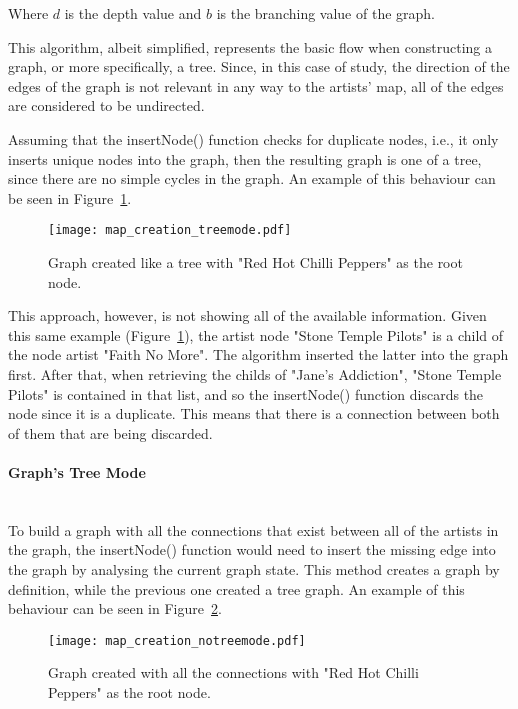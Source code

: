       Where $d$ is the depth value and $b$ is the branching value of the graph.

      This algorithm, albeit simplified, represents the basic flow when constructing a graph, or more specifically, a tree.
      Since, in this case of study, the direction of the edges of the graph is not relevant in any way to the artists' map, all of the edges are considered to be undirected.

      Assuming that the insertNode() function checks for duplicate nodes, i.e., it only inserts unique nodes into the graph, then the resulting graph is one of a tree, since there are no simple cycles in the graph.
      An example of this behaviour can be seen in Figure~\ref{fig:graph_treemode}.

      \begin{figure}[ht]
        \begin{center}
          \texttt{[image: map\_creation\_treemode.pdf]}
        \end{center}
        \caption{Graph created like a tree with "Red Hot Chilli Peppers" as the root node.}
        \label{fig:graph_treemode}
      \end{figure}

      This approach, however, is not showing all of the available information.
      Given this same example (Figure~\ref{fig:graph_treemode}), the artist node "Stone Temple Pilots" is a child of the node artist "Faith No More".
      The algorithm inserted the latter into the graph first.
      After that, when retrieving the childs of "Jane's Addiction", "Stone Temple Pilots" is contained in that list, and so the insertNode() function discards the node since it is a duplicate.
      This means that there is a connection between both of them that are being discarded.

      \paragraph{Graph's Tree Mode} \hfill \\
      To build a graph with all the connections that exist between all of the artists in the graph, the insertNode() function would need to insert the missing edge into the graph by analysing the current graph state.
      This method creates a graph by definition, while the previous one created a tree graph.
      An example of this behaviour can be seen in Figure~\ref{fig:graph_notreemode}.

      \begin{figure}[ht]
        \begin{center}
          \texttt{[image: map\_creation\_notreemode.pdf]}
        \end{center}
        \caption{Graph created with all the connections with "Red Hot Chilli Peppers" as the root node.}
        \label{fig:graph_notreemode}
      \end{figure}

